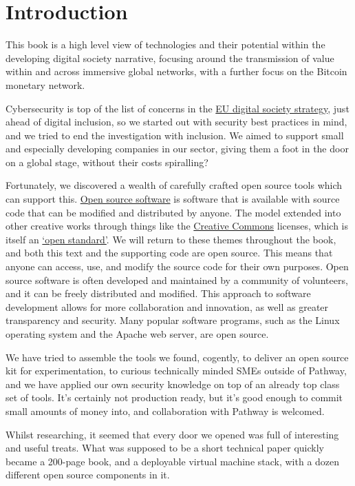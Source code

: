 \section{Introduction}
This book is a high level view of technologies and their potential within the developing digital society narrative, focusing around the transmission of value within and across immersive global networks, with a further focus on the Bitcoin monetary network.\par
Cybersecurity is top of the list of concerns in the \href{https://digital-strategy.ec.europa.eu/en/policies}{EU digital society strategy}, just ahead of digital inclusion, so we started out with security best practices in mind, and we tried to end the investigation with inclusion. We aimed to support small and especially developing companies in our sector, giving them a foot in the door on a global stage, without their costs spiralling? \par
Fortunately, we discovered a wealth of carefully crafted open source tools which can support this. \href{https://opensource.org/osd}{Open source software} is software that is available with source code that can be modified and distributed by anyone. The model extended into other creative works through things like the \href{https://creativecommons.org/licenses/}{Creative Commons} licenses, which is itself an \href{https://open-stand.org/about-us/principles/}{`open standard'}. We will return to these themes throughout the book, and both this text and the supporting code are open source. This means that anyone can access, use, and modify the source code for their own purposes. Open source software is often developed and maintained by a community of volunteers, and it can be freely distributed and modified. This approach to software development allows for more collaboration and innovation, as well as greater transparency and security. Many popular software programs, such as the Linux operating system and the Apache web server, are open source.\par
We have tried to assemble the tools we found, cogently, to deliver an open source kit for experimentation, to curious technically minded SMEs outside of Pathway, and we have applied our own security knowledge on top of an already top class set of tools. It’s certainly not production ready, but it's good enough to commit small amounts of money into, and collaboration with Pathway is welcomed.\par
Whilst researching, it seemed that every door we opened was full of interesting and useful treats. What was supposed to be a short technical paper quickly became a 200-page book, and a deployable virtual machine stack, with a dozen different open source components in it. \par
